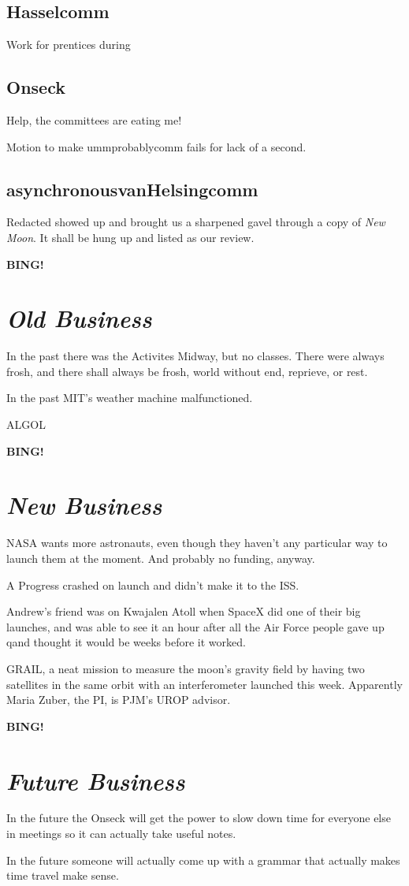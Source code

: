\documentclass[10pt]{article}
\newcommand{\bing}{{\bf BING!} }
\newcommand{\goto}[1]{\bing \vskip 12pt \section*{{\em{#1}}}}
\begin{document}
\subsection*{Hasselcomm}

Work for prentices during 


\subsection*{Onseck}

Help, the committees are eating me!

Motion to make ummprobablycomm fails for lack of a second.


\subsection*{asynchronousvanHelsingcomm}

Redacted showed up and brought us a sharpened gavel through 
a copy of \emph{New Moon}.  It shall be hung up and listed as
our review.


\goto{Old Business}

In the past there was the Activites Midway, but no classes.  There
were always frosh, and there shall always be frosh, world without
end, reprieve, or rest.

In the past MIT's weather machine malfunctioned.

ALGOL

\goto{New Business}

NASA wants more astronauts, even though they haven't any particular
way to launch them at the moment.  And probably no funding, anyway.

A Progress crashed on launch and didn't make it to the ISS.

Andrew's friend was on Kwajalen Atoll when SpaceX did one of their big
launches, and was able to see it an hour after all the Air Force
people gave up qand thought it would be weeks before it worked.

GRAIL, a neat mission to measure the moon's gravity field by having
two satellites in the same orbit with an interferometer launched this
week.  Apparently Maria Zuber, the PI, is PJM's UROP advisor.


\goto{Future Business}

In the future the Onseck will get the power to slow down time for
everyone else in meetings so it can actually take useful notes.

In the future someone will actually come up with a grammar
that actually makes time travel make sense.
\end{document}
